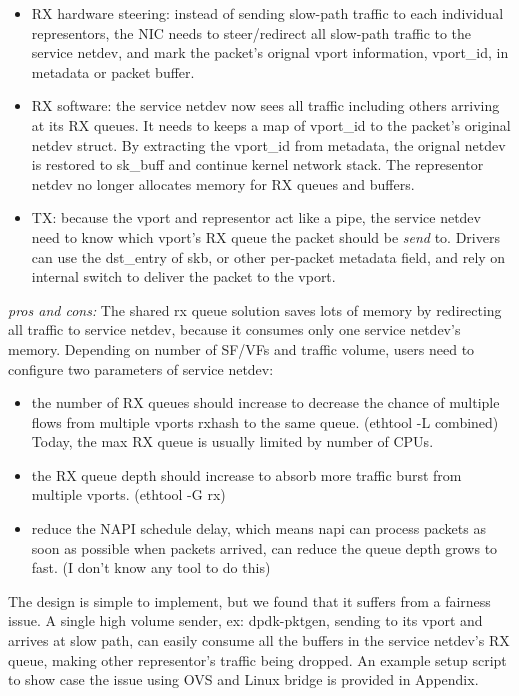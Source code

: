 \documentclass[letterpaper]{article}
\begin{document}
\begin{itemize}
\item RX hardware steering: instead of sending slow-path traffic to
each individual representors, the NIC needs to steer/redirect all
slow-path traffic to the service netdev, and mark the packet's orignal
vport information, vport\_id, in metadata or packet buffer.
\item RX software: the service netdev now sees all traffic including
others arriving at its RX queues. It needs to keeps a map of vport\_id
to the packet's original netdev struct. By extracting the vport\_id
from metadata, the orignal netdev is restored to sk\_buff and continue
kernel network stack. The representor netdev no longer allocates memory
for RX queues and buffers.
\item TX: because the vport and representor act like a pipe, the service
netdev need to know which vport's RX queue the packet should be \emph{send}
to. Drivers can use the dst\_entry of skb, or other per-packet metadata
field, and rely on internal switch to deliver the packet to the vport.
\end{itemize}

\emph{pros and cons:}
The shared rx queue solution saves lots of memory by redirecting
all traffic to service netdev, because it consumes only one service
netdev's memory. Depending on number of SF/VFs and traffic volume,
users need to configure two parameters of service netdev:
\begin{itemize}
    \item the number of RX queues should increase to decrease the chance
    of multiple flows from multiple vports rxhash to the same queue.
    (ethtool -L combined) Today, the max RX queue is usually limited by
    number of CPUs.
    \item the RX queue depth should increase to absorb more traffic
    burst from multiple vports. (ethtool -G rx)
    \item reduce the NAPI schedule delay, which means napi can process
    packets as soon as possible when packets arrived, can reduce the queue
    depth grows to fast. (I don't know any tool to do this)
\end{itemize}

The design is simple to implement, but we found that it suffers from
a fairness issue. A single high volume sender, ex: dpdk-pktgen,
sending to its vport and arrives at slow path, can easily consume all
the buffers in the service netdev's RX queue, making other representor's
traffic being dropped. An example setup script to show case the issue
using OVS and Linux bridge is provided in Appendix.
\end{document}
